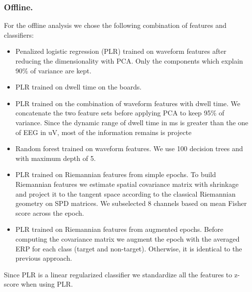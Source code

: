 \documentclass[12pt]{iopart}
\begin{document}
\subsubsection*{Offline.}
For the offline analysis we chose the following combination of features and classifiers:
\begin{itemize}
    \item Penalized logistic regression (PLR) trained on waveform features after reducing
        the dimensionality with PCA. Only the components which explain 90\% of variance
        are kept. 
    \item PLR trained on dwell time on the boards.
    \item PLR trained on the combination of waveform features with dwell time. We concatenate
        the two feature sets before applying PCA to keep 95\% of variance. Since the dynamic
        range of dwell time in ms is greater than the one of EEG in uV, most of the information
        remains is projecte
    \item Random forest trained on waveform features. We use 100 decision trees and
        with maximum depth of 5.
    \item PLR trained on Riemannian features from simple epochs.
        To build Riemannian features we
        estimate spatial covariance matrix with shrinkage and project it
        to the tangent space according to the classical Riemannian geometry on SPD matrices.
        We subselected 8 channels based on mean Fisher score across the epoch.
    \item PLR trained on Riemannian features from augmented epochs.
        Before computing the covariance matrix we augment the epoch with the averaged ERP
        for each class (target and non-target). Otherwise, it is identical to the previous
        approach.
\end{itemize}

Since PLR is a linear regularized classifier we standardize all the features to z-score when
using PLR.
\end{document}
